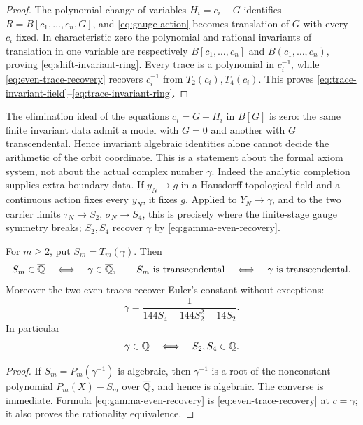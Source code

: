 \begin{proof}
The polynomial change of variables \(H_i=c_i-G\) identifies
\(R=B[c_1,\ldots,c_n,G]\), and \eqref{eq:gauge-action} becomes translation
of \(G\) with every \(c_i\) fixed.  In characteristic zero the polynomial
and rational invariants of translation in one variable are respectively
\(B[c_1,\ldots,c_n]\) and \(B(c_1,\ldots,c_n)\), proving
\eqref{eq:shift-invariant-ring}.  Every trace is a polynomial in
\(c_i^{-1}\), while \eqref{eq:even-trace-recovery} recovers \(c_i^{-1}\)
from \(T_2(c_i),T_4(c_i)\).  This proves
\eqref{eq:trace-invariant-field}--\eqref{eq:trace-invariant-ring}.
\end{proof}

\begin{remark}
The elimination ideal of the equations \(c_i=G+H_i\) in \(B[G]\) is zero:
the same finite invariant data admit a model with \(G=0\) and another with
\(G\) transcendental.  Hence invariant algebraic identities alone cannot
decide the arithmetic of the orbit coordinate.  This is a statement about
the formal axiom system, not about the actual complex number \(\gamma\).
Indeed the analytic completion supplies extra boundary data.  If
\(y_N\to g\) in a Hausdorff topological field and a continuous action fixes
every \(y_N\), it fixes \(g\).  Applied to \(Y_N\to\gamma\), and to the two
carrier limits \(\tau_N\to S_2\), \(\sigma_N\to S_4\), this is precisely
where the finite-stage gauge symmetry breaks; \(S_2,S_4\) recover
\(\gamma\) by \eqref{eq:gamma-even-recovery}.
\end{remark}

\begin{corollary}
\label{cor:Euler-trace-arithmetic}
For \(m\ge2\), put \(S_m=T_m(\gamma)\).  Then
\[
 S_m\in\overline{\mathbb Q}\quad\Longleftrightarrow\quad\gamma\in\overline{\mathbb Q},
 \qquad
 S_m\text{ is transcendental}
 \quad\Longleftrightarrow\quad\gamma\text{ is transcendental}.
\]
Moreover the two even traces recover Euler's constant without exceptions:
\begin{equation}\label{eq:gamma-even-recovery}
 \boxed{\displaystyle
 \gamma=\frac1{144S_4-144S_2^2-14S_2}.}
\end{equation}
In particular
\[
 \gamma\in\mathbb Q\quad\Longleftrightarrow\quad S_2,S_4\in\mathbb Q.
\]
\end{corollary}

\begin{proof}
If \(S_m=P_m(\gamma^{-1})\) is algebraic, then \(\gamma^{-1}\) is a root
of the nonconstant polynomial \(P_m(X)-S_m\) over \(\overline{\mathbb Q}\), and hence is
algebraic.  The converse is immediate.  Formula
\eqref{eq:gamma-even-recovery} is \eqref{eq:even-trace-recovery} at
\(c=\gamma\); it also proves the rationality equivalence.
\end{proof}

